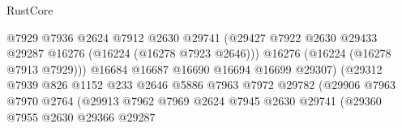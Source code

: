 \begin{lexlean}{RustCore}
\begin{coremodule}
                                                @7929
                                                @7936
                                                @2624
                                                @7912
                                                @2630
                                                @29741
                                                (@29427
                                                  @7922
                                                  @2630
                                                  @29433
                                                  @29287
                                                  @16276
                                                  (@16224 (@16278 @7923 @2646)))
                                                @16276
                                                (@16224 (@16278 @7913 @7929)))
                                              @16684
                                              @16687
                                              @16690
                                              @16694
                                              @16699
                                              @29307)
                                            (@29312
                                              @7939
                                              @826
                                              @1152
                                              @233
                                              @2646
                                              @5886
                                              @7963
                                              @7972
                                              @29782
                                              (@29906
                                                @7963
                                                @7970
                                                @2764
                                                (@29913
                                                  @7962
                                                  @7969
                                                  @2624
                                                  @7945
                                                  @2630
                                                  @29741
                                                  (@29360
                                                    @7955
                                                    @2630
                                                    @29366
                                                    @29287

\end{coremodule}
\end{lexlean}
